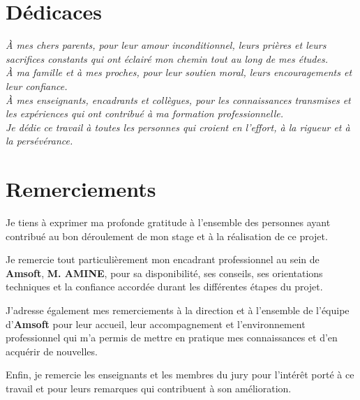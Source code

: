 \documentclass[12pt,a4paper]{report}
\begin{document}
\chapter*{Dédicaces}
\begin{center}
    \itshape
    À mes chers parents, pour leur amour inconditionnel, leurs prières et leurs sacrifices constants qui ont éclairé mon chemin tout au long de mes études.\\[1cm]
    
    À ma famille et à mes proches, pour leur soutien moral, leurs encouragements et leur confiance.\\[1cm]
    
    À mes enseignants, encadrants et collègues, pour les connaissances transmises et les expériences qui ont contribué à ma formation professionnelle.\\[1cm]
    
    Je dédie ce travail à toutes les personnes qui croient en l'effort, à la rigueur et à la persévérance.
\end{center}
\newpage

\chapter*{Remerciements}
Je tiens à exprimer ma profonde gratitude à l'ensemble des personnes ayant contribué au bon déroulement de mon stage et à la réalisation de ce projet.

Je remercie tout particulièrement mon encadrant professionnel au sein de \textbf{Amsoft}, \textbf{M. AMINE}, pour sa disponibilité, ses conseils, ses orientations techniques et la confiance accordée durant les différentes étapes du projet.

J'adresse également mes remerciements à la direction et à l'ensemble de l'équipe d'\textbf{Amsoft} pour leur accueil, leur accompagnement et l'environnement professionnel qui m'a permis de mettre en pratique mes connaissances et d'en acquérir de nouvelles.

Enfin, je remercie les enseignants et les membres du jury pour l'intérêt porté à ce travail et pour leurs remarques qui contribuent à son amélioration.
\newpage

\tableofcontents
\newpage
\listoffigures
\newpage
\listoftables
\newpage

\end{document}
